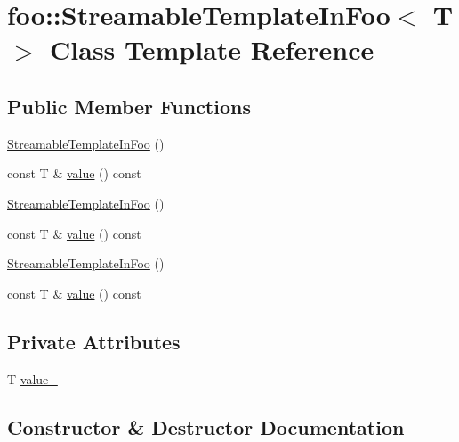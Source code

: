 \hypertarget{classfoo_1_1_streamable_template_in_foo}{}\section{foo\+::Streamable\+Template\+In\+Foo$<$ T $>$ Class Template Reference}
\label{classfoo_1_1_streamable_template_in_foo}
\subsection*{Public Member Functions}
\begin{DoxyCompactItemize}
\item 
\mbox{\hyperlink{classfoo_1_1_streamable_template_in_foo_a0e5d7147d321adf8a2ec348243da70ea}{Streamable\+Template\+In\+Foo}} ()
\item 
const T \& \mbox{\hyperlink{classfoo_1_1_streamable_template_in_foo_aa6e29a9a298014ce74c65423b6985023}{value}} () const
\item 
\mbox{\hyperlink{classfoo_1_1_streamable_template_in_foo_a0e5d7147d321adf8a2ec348243da70ea}{Streamable\+Template\+In\+Foo}} ()
\item 
const T \& \mbox{\hyperlink{classfoo_1_1_streamable_template_in_foo_aa6e29a9a298014ce74c65423b6985023}{value}} () const
\item 
\mbox{\hyperlink{classfoo_1_1_streamable_template_in_foo_a0e5d7147d321adf8a2ec348243da70ea}{Streamable\+Template\+In\+Foo}} ()
\item 
const T \& \mbox{\hyperlink{classfoo_1_1_streamable_template_in_foo_aa6e29a9a298014ce74c65423b6985023}{value}} () const
\end{DoxyCompactItemize}
\subsection*{Private Attributes}
\begin{DoxyCompactItemize}
\item 
T \mbox{\hyperlink{classfoo_1_1_streamable_template_in_foo_a6768ecbcc4e77edf9d5150b173d985c3}{value\+\_\+}}
\end{DoxyCompactItemize}


\subsection{Constructor \& Destructor Documentation}
\mbox{\label{classfoo_1_1_streamable_template_in_foo_a0e5d7147d321adf8a2ec348243da70ea}} 
